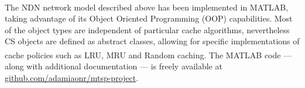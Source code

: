 The NDN network model described above has been implemented in MATLAB\textsuperscript{\textregistered}, taking 
advantage of its Object Oriented Programming (OOP) capabilities. Most of 
the object types are independent of particular cache algorithms, nevertheless 
CS objects are defined as abstract classes, allowing for specific 
implementations of cache policies such as LRU, MRU and Random caching. The 
MATLAB\textsuperscript{\textregistered} 
code --- along with additional documentation --- is freely available 
at \url{github.com/adamiaonr/mtsp-project}.
